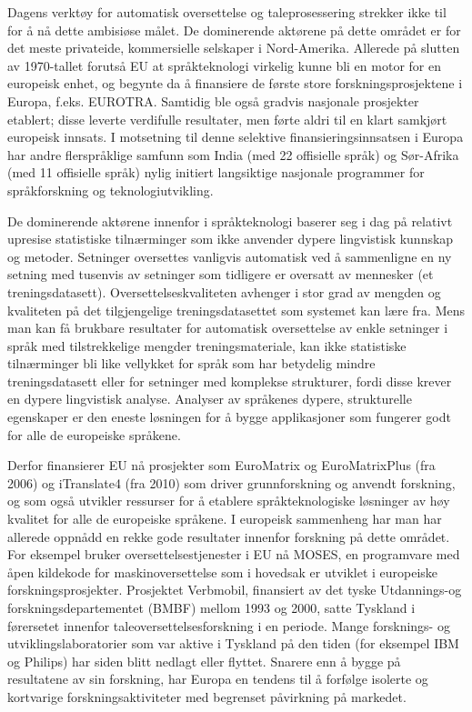 \begin{multicols}{2}
Dagens verktøy for automatisk oversettelse og taleprosessering strekker ikke til for å nå dette ambisiøse målet. De dominerende aktørene på dette området er for det meste privateide, kommersielle selskaper i Nord-Amerika. Allerede på slutten av 1970-tallet forutså EU at språkteknologi virkelig kunne bli en motor for en europeisk enhet, og begynte da å finansiere de første store forskningsprosjektene i Europa, f.eks. EUROTRA. Samtidig ble også gradvis nasjonale prosjekter etablert; disse leverte verdifulle resultater, men førte aldri til en klart samkjørt europeisk innsats. I motsetning til denne selektive finansieringsinnsatsen i Europa har andre flerspråklige samfunn som India (med 22 offisielle språk) og Sør-Afrika (med 11 offisielle språk) nylig initiert langsiktige nasjonale programmer for språkforskning og teknologiutvikling.

De dominerende aktørene innenfor i språkteknologi baserer seg i dag på relativt upresise statistiske tilnærminger som ikke anvender dypere lingvistisk kunnskap og metoder. Setninger oversettes vanligvis automatisk ved å sammenligne en ny setning med tusenvis av setninger som tidligere er oversatt av mennesker (et treningsdatasett). Oversettelseskvaliteten avhenger i stor grad av mengden og kvaliteten på det tilgjengelige treningsdatasettet som systemet kan lære fra. Mens man kan få brukbare resultater for automatisk oversettelse av enkle setninger i språk med tilstrekkelige mengder treningsmateriale, kan ikke statistiske tilnærminger bli like vellykket for språk som har betydelig mindre treningsdatasett eller for setninger med komplekse strukturer, fordi disse krever en dypere lingvistisk analyse. Analyser av språkenes dypere, strukturelle egenskaper er den eneste løsningen for å bygge applikasjoner som fungerer godt for alle de europeiske språkene.


Derfor finansierer EU nå prosjekter som EuroMatrix og EuroMatrixPlus (fra 2006) og iTranslate4 (fra 2010) som driver grunnforskning og anvendt forskning, og som også utvikler ressurser for å etablere språkteknologiske løsninger av høy kvalitet for alle de europeiske språkene.
I europeisk sammenheng har man har allerede oppnådd en rekke gode resultater innenfor forskning på dette området. For eksempel bruker oversettelsestjenester i EU nå MOSES, en programvare med åpen kildekode for maskinoversettelse som i hovedsak er utviklet i europeiske forskningsprosjekter. Prosjektet Verbmobil, finansiert av det tyske Utdannings-og forskningsdepartementet (BMBF) mellom 1993 og 2000, satte Tyskland i førersetet innenfor taleoversettelsesforskning i en periode. Mange forsknings- og utviklingslaboratorier som var aktive i Tyskland på den tiden (for eksempel IBM og Philips) har siden blitt nedlagt eller flyttet. Snarere enn å bygge på resultatene av sin forskning, har Europa en tendens til å forfølge isolerte og kortvarige forskningsaktiviteter med begrenset påvirkning på markedet. 


\end{multicols}
